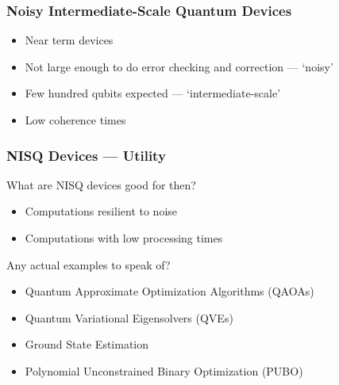 
\begin{frame}
    \frametitle{Noisy Intermediate-Scale Quantum Devices}

    \begin{itemize}[<+->]
        \item Near term devices
        \item Not large enough to do error checking and correction --- `noisy'
        \item Few hundred qubits expected --- `intermediate-scale'
        \item Low coherence times
    \end{itemize}


\end{frame}

\begin{frame}
    \frametitle{NISQ Devices --- Utility}

    What are NISQ devices good for then?

    \pause

    \begin{itemize}
        \item Computations resilient to noise
        \item Computations with low processing times
    \end{itemize}

    \pause

    Any actual examples to speak of?

\end{frame}

\begin{frame}

    \begin{itemize}
        \item Quantum Approximate Optimization Algorithms (QAOAs)
        \item Quantum Variational Eigensolvers (QVEs)
        \item Ground State Estimation
        \item Polynomial Unconstrained Binary Optimization (PUBO)
    \end{itemize}


\end{frame}
